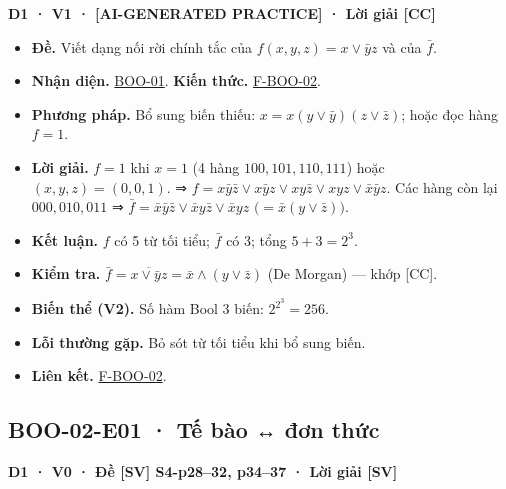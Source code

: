 \documentclass[
  10pt,
  twoside,openany]{book}
\providecommand{\tightlist}{%
  \setlength{\itemsep}{0pt}\setlength{\parskip}{0pt}}
\begin{document}
\textbf{D1 · V1 · {[}AI-GENERATED PRACTICE{]} · Lời giải {[}CC{]}}

\begin{itemize}
\tightlist
\item
  \textbf{Đề.} Viết dạng nối rời chính tắc của \(f(x,y,z)=x\vee\bar yz\)
  và của \(\bar f\).
\item
  \textbf{Nhận diện.} \protect\hyperlink{BOO-01}{BOO-01}. \textbf{Kiến
  thức.} \protect\hyperlink{F-BOO-02}{F-BOO-02}.
\item
  \textbf{Phương pháp.} Bổ sung biến thiếu:
  \(x=x(y\vee\bar y)(z\vee\bar z)\); hoặc đọc hàng \(f=1\).
\item
  \textbf{Lời giải.} \(f=1\) khi \(x=1\) (4 hàng \(100,101,110,111\))
  hoặc \((x,y,z)=(0,0,1)\). ⇒
  \(f=x\bar y\bar z\vee x\bar yz\vee xy\bar z\vee xyz\vee\bar x\bar yz\).
  Các hàng còn lại \(000,010,011\) ⇒
  \(\bar f=\bar x\bar y\bar z\vee\bar xy\bar z\vee\bar xyz\)
  \(\big(=\bar x(y\vee\bar z)\big)\).
\item
  \textbf{Kết luận.} \(f\) có 5 từ tối tiểu; \(\bar f\) có 3; tổng
  \(5+3=2^3\).
\item
  \textbf{Kiểm tra.}
  \(\bar f=\overline{x\vee\bar yz}=\bar x\wedge(y\vee\bar z)\) (De
  Morgan) --- khớp {[}CC{]}.
\item
  \textbf{Biến thể (V2).} Số hàm Bool 3 biến: \(2^{2^3}=256\).
\item
  \textbf{Lỗi thường gặp.} Bỏ sót từ tối tiểu khi bổ sung biến.
\item
  \textbf{Liên kết.} \protect\hyperlink{F-BOO-02}{F-BOO-02}.
\end{itemize}

\hypertarget{BOO-02-E01}{%
\subsection{BOO-02-E01 · Tế bào ↔ đơn thức}\label{BOO-02-E01}}

\textbf{D1 · V0 · Đề {[}SV{]} S4-p28--32, p34--37 · Lời giải {[}SV{]}}
\end{document}
